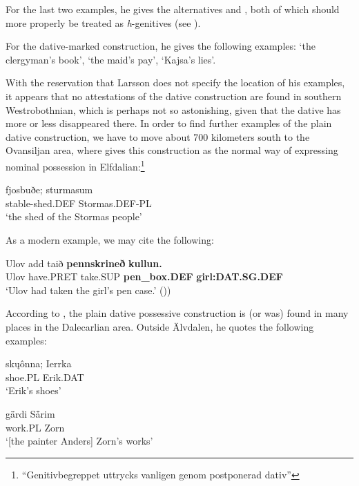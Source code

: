 
For the last two examples, he gives the alternatives  and , both of which should more properly be treated as \textit{h}{}-genitives (see ).

For the dative-marked construction, he gives the following examples:  ‘the clergyman’s book’,  ‘the maid’s pay’, ‘Kajsa’s lies’. 

With the reservation that Larsson does not specify the location of his examples, it appears that no attestations of the dative construction are found in southern Westrobothnian, which is perhaps not so astonishing, given that the dative has more or less disappeared there. In order to find further examples of the plain dative construction, we have to move about 700 kilometers south to the Ovansiljan area, where \citet[97]{Levander1909} gives this construction as the normal way of expressing nominal possession in Elfdalian:\footnote{ “Genitivbegreppet uttrycks vanligen genom postponerad dativ”}

\ea\label{}
\gll fjosbuðe;  sturmasum\\
stable-shed.DEF  Stormas.DEF-PL\\
\glt ‘the shed of the Stormas people’
\z

As a modern example, we may cite the following:

\ea\label{}
\gll Ulov  add  taið  \textbf{pennskrineð} \textbf{kullun.}\\
Ulov  have.PRET  take.SUP  \textbf{pen\_box.DEF} \textbf{girl:DAT.SG.DEF}\\
\glt ‘Ulov had taken the girl’s pen case.’ (\citet[120]{Åkerberg2012}))
\z

According to \citet[112]{Levander1928}, the plain dative possessive construction is (or was) found in many places in the Dalecarlian area. Outside Älvdalen, he quotes the following examples:

\ea\label{}
\gll sk\k{u}ônna;  Ierrka\\
shoe.PL  Erik.DAT\\
\glt ‘Erik’s shoes’
\z

\ea\label{}
\gll g\={ä}rdi  S\={å}rim\\
work.PL  Zorn\\
\glt ‘[the painter Anders] Zorn’s works’ 
\z

